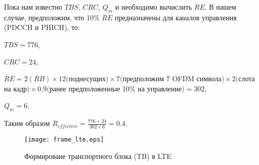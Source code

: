 Пока нам известно $TBS$, $CRC$, $Q_{m}$ и необходимо вычислить $RE$. В нашем случае, предположим, что 10\% $RE$ предназначены для каналов управления (PDCCH и PHICH), то:

$TBS=776$,

$CRC=24$,

$RE=2(RB) \times 12($поднесущих$) \times 7 ($предположим 7 OFDM символа$) \times 2 ($слота на кадр$) \times 0.9 ($ранее предположенные 10\% на управление$)= 302$,

$Q_{m}=6$.

Таким образом $R_{effective}=\frac{776+24}{302 \times 6}=0.4$.

\begin{figure} [h]
  \center
\texttt{[image: frame\_lte.eps]}
  \caption{Формироваие транспортного блока (TB) в LTE}
  \label{img:frame_lte}
\end{figure}



\clearpage

